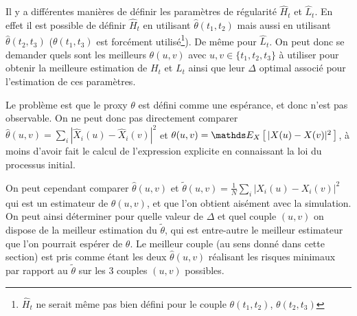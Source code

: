 Il y a différentes manières de définir les paramètres de régularité $\hat H_t$ et $\hat L_t$. En effet il est possible de définir $\hat H_t$ en utilisant $\hat \theta (t_1, t_2)$ mais aussi en utilisant $\hat \theta (t_2, t_3)$ ($\theta(t_1, t_3)$ est forcément utilisé\footnote{$\hat H_t$ ne serait même pas bien défini pour le couple $\theta(t_1, t_2)$, $\theta(t_2, t_3)$}). De même pour $\hat L_t$. On peut donc se demander quels sont les meilleurs $\theta(u,v)$ avec $u,v \in \{t_1, t_2, t_3\}$ à utiliser pour obtenir la meilleure estimation de $H_t$ et $L_t$ ainsi que leur $\Delta$ optimal associé pour l'estimation de ces paramètres.

\bigskip

Le problème est que le proxy $\theta$ est défini comme une espérance, et donc n'est pas observable. On ne peut donc pas directement comparer $\hat \theta(u,v) = \sum_i|\widehat X_i(u) - \widehat X_i(v)|^2$ et $\theta(u,v) = \esperanceloi X { |X(u) - X(v)|^2 }$, à moins d'avoir fait le calcul de l'expression explicite en connaissant la loi du processus initial.

\bigskip

On peut cependant comparer $\hat \theta(u,v)$ et $\widetilde \theta(u,v) = \frac 1 N \sum_i |X_i(u) - X_i(v)|^2$ qui est un estimateur de $\theta(u,v)$, et que l'on obtient aisément avec la simulation. On peut ainsi déterminer pour quelle valeur de $\Delta$ et quel couple $(u,v)$ on dispose de la meilleur estimation du $\tilde \theta$, qui est entre-autre le meilleur estimateur que l'on pourrait espérer de $\theta$. Le meilleur couple (au sens donné dans cette section) est pris comme étant les deux $\hat \theta(u,v)$ réalisant les risques minimaux par rapport au $\tilde \theta$ sur les 3 couples $(u,v)$ possibles.

